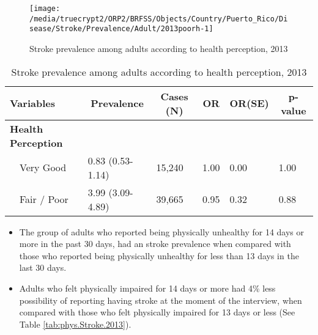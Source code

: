 \begin{figure}[H]
\caption{Stroke prevalence among adults according to health perception,
         2013}
\label{fig:fairpoor.Stroke.2013}

\begin{knitrout}
\color{fgcolor}

{\centering \texttt{[image: /media/truecrypt2/ORP2/BRFSS/Objects/Country/Puerto\_Rico/Disease/Stroke/Prevalence/Adult/2013poorh-1]} 

}



\end{knitrout}
 \end{figure}

\begin{table}[H]
\caption{Stroke prevalence  among adults according to health perception, 2013\label{tab:fairpoor.Stroke.2013}} 
\begin{center}
\begin{tabular}{llllll}
\hline\hline
\multicolumn{1}{l}{Variables}&\multicolumn{1}{c}{Prevalence}&\multicolumn{1}{c}{Cases (N)}&\multicolumn{1}{c}{OR}&\multicolumn{1}{c}{OR(SE)}&\multicolumn{1}{c}{p-value}\tabularnewline
\hline
{\bfseries Health Perception}&&&&&\tabularnewline
~~Very Good&0.83 (0.53-1.14)&15,240&1.00&0.00&1.00\tabularnewline
~~Fair / Poor&3.99 (3.09-4.89)&39,665&0.95&0.32&0.88\tabularnewline
\hline
\end{tabular}\end{center}

\end{table}

 
\newpage

 \newpage
\begin{itemize}

\item The group of adults who reported being physically unhealthy for 14 days or more in the past 30 days, had an  
 stroke prevalence when compared with 
those who reported being physically unhealthy for less than 13 days in the last 30 days.


\item Adults who felt physically impaired for 14 days or more had 4\% less possibility of reporting having stroke at the moment of the interview, when compared with those who felt physically impaired for 13 days or less (See Table \ref{tab:phys.Stroke.2013}).

\end{itemize}

